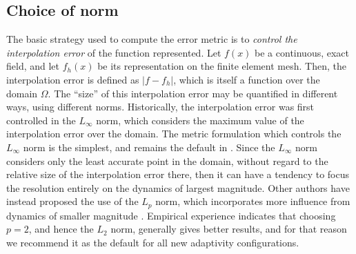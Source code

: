 \subsection{Choice of norm} \label{sec:norm_choice}
The basic strategy used to compute the error metric is to \emph{control the interpolation
error} of the function represented. Let $f(x)$ be a continuous, exact field, and let
$f_h(x)$ be its representation on the finite element mesh. Then, the interpolation error
is defined as $\left| f - f_h \right|$, which is itself a function over the domain $\Omega$.
The ``size'' of this interpolation error may be quantified in different ways, using different norms.
Historically, the interpolation error was first controlled in the $L_{\infty}$ norm, which considers
the maximum value of the interpolation error over the domain. The metric formulation which
controls the $L_{\infty}$ norm is the simplest, and remains the default in \fluidity. Since the $L_{\infty}$
norm considers only the least accurate point in the domain, without regard to the relative size of the
interpolation error there, then it can have a tendency to focus the resolution entirely on the 
dynamics of largest magnitude. Other authors have instead proposed the use of the $L_p$ norm, which incorporates
more influence from dynamics of smaller magnitude \citep{alauzet2008,loseille2010ii}. Empirical experience indicates that choosing $p=2$, and hence the $L_2$ norm, generally gives better results, and for that reason we recommend it as the default for all new adaptivity configurations.

